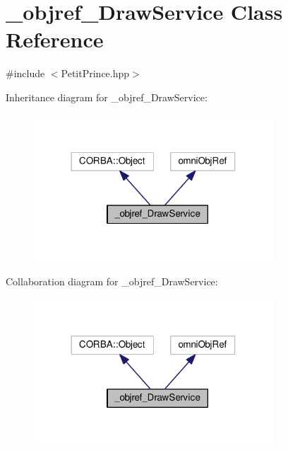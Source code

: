 \hypertarget{class__objref___draw_service}{}\section{\+\_\+objref\+\_\+\+Draw\+Service Class Reference}
\label{class__objref___draw_service}


{\ttfamily \#include $<$Petit\+Prince.\+hpp$>$}



Inheritance diagram for \+\_\+objref\+\_\+\+Draw\+Service\+:
\nopagebreak
\begin{figure}[H]
\begin{center}
\leavevmode
\includegraphics[width=254pt]{class__objref___draw_service__inherit__graph}
\end{center}
\end{figure}


Collaboration diagram for \+\_\+objref\+\_\+\+Draw\+Service\+:
\nopagebreak
\begin{figure}[H]
\begin{center}
\leavevmode
\includegraphics[width=254pt]{class__objref___draw_service__coll__graph}
\end{center}
\end{figure}
